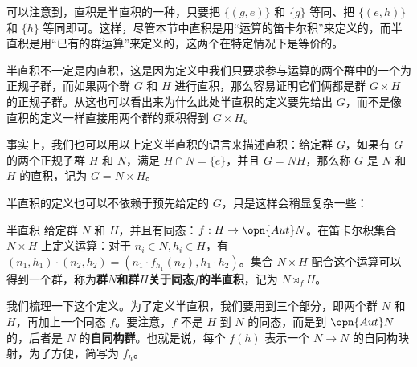 可以注意到，直积是半直积的一种，只要把 $\{(g, e)\}$ 和 $\{g\}$ 等同、把 $\{(e, h)\}$ 和 $\{h\}$ 等同即可。这样，尽管本节中直积是用“运算的笛卡尔积”来定义的，而半直积是用“已有的群运算”来定义的，这两个在特定情况下是等价的。

半直积不一定是内直积，这是因为定义中我们只要求参与运算的两个群中的一个为正规子群，而如果两个群 $G$ 和 $H$ 进行直积，那么容易证明它们俩都是群 $G\times H$ 的正规子群。从这也可以看出来为什么此处半直积的定义要先给出 $G$，而不是像直积的定义一样直接用两个群的乘积得到 $G\times H$。

事实上，我们也可以用以上定义半直积的语言来描述直积：给定群 $G$，如果有 $G$ 的两个正规子群 $H$ 和 $N$，满足 $H\cap N=\{e\}$，并且 $G=NH$，那么称 $G$ 是 $N$ 和 $H$ 的直积，记为 $G=N\times H$。

半直积的定义也可以不依赖于预先给定的 $G$，只是这样会稍显复杂一些：

\begin{definition}{半直积}
给定群 $N$ 和 $H$，并且有同态：$f:H\rightarrow \opn{Aut}N$。在笛卡尔积集合 $N\times H$ 上定义运算：对于 $n_i\in N, h_i\in H$，有 $(n_1, h_1)\cdot(n_2, h_2)=(n_1\cdot f_{h_1}(n_2), h_1\cdot h_2)$。集合 $N\times H$ 配合这个运算可以得到一个群，称为\textbf{群}$N$\textbf{和群}$H$\textbf{关于同态}$f$\textbf{的半直积}，记为 $N\rtimes_fH$。
\end{definition}

我们梳理一下这个定义。为了定义半直积，我们要用到三个部分，即两个群 $N$ 和 $H$，再加上一个同态 $f$。要注意，$f$ 不是 $H$ 到 $N$ 的同态，而是到 $\opn{Aut} N$ 的，后者是 $N$ 的\textbf{自同构群}。也就是说，每个 $f(h)$ 表示一个 $N\rightarrow N$ 的自同构映射，为了方便，简写为 $f_h$。













